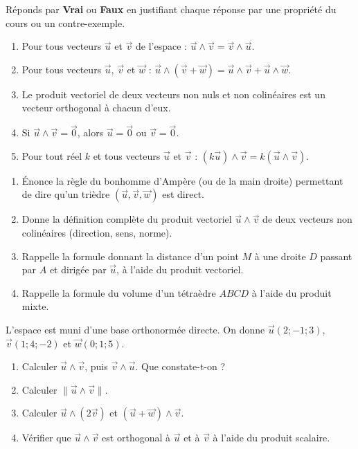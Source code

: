 \documentclass[11pt]{article}
\begin{document}
\begin{exercice}
Réponds par \textbf{Vrai} ou \textbf{Faux} en justifiant chaque réponse par une propriété du cours ou un contre-exemple.
\begin{enumerate}
\item Pour tous vecteurs $\vec{u}$ et $\vec{v}$ de l'espace : $\vec{u} \wedge \vec{v} = \vec{v} \wedge \vec{u}$.
\item Pour tous vecteurs $\vec{u}$, $\vec{v}$ et $\vec{w}$ : $\vec{u} \wedge (\vec{v} + \vec{w}) = \vec{u} \wedge \vec{v} + \vec{u} \wedge \vec{w}$.
\item Le produit vectoriel de deux vecteurs non nuls et non colinéaires est un vecteur orthogonal à chacun d'eux.
\item Si $\vec{u} \wedge \vec{v} = \vec{0}$, alors $\vec{u} = \vec{0}$ ou $\vec{v} = \vec{0}$.
\item Pour tout réel $k$ et tous vecteurs $\vec{u}$ et $\vec{v}$ : $(k\vec{u}) \wedge \vec{v} = k(\vec{u} \wedge \vec{v})$.
\end{enumerate}
\end{exercice}

\begin{exercice}
\begin{enumerate}
\item Énonce la règle du bonhomme d'Ampère (ou de la main droite) permettant de dire qu'un trièdre $(\vec{u}, \vec{v}, \vec{w})$ est direct.
\item Donne la définition complète du produit vectoriel $\vec{u} \wedge \vec{v}$ de deux vecteurs non colinéaires (direction, sens, norme).
\item Rappelle la formule donnant la distance d'un point $M$ à une droite $D$ passant par $A$ et dirigée par $\vec{u}$, à l'aide du produit vectoriel.
\item Rappelle la formule du volume d'un tétraèdre $ABCD$ à l'aide du produit mixte.
\end{enumerate}
\end{exercice}

\begin{exercice}
L'espace est muni d'une base orthonormée directe. On donne $\vec{u}(2 ; -1 ; 3)$, $\vec{v}(1 ; 4 ; -2)$ et $\vec{w}(0 ; 1 ; 5)$.
\begin{enumerate}
\item Calculer $\vec{u} \wedge \vec{v}$, puis $\vec{v} \wedge \vec{u}$. Que constate-t-on ?
\item Calculer $\|\vec{u} \wedge \vec{v}\|$.
\item Calculer $\vec{u} \wedge (2\vec{v})$ et $(\vec{u} + \vec{w}) \wedge \vec{v}$.
\item Vérifier que $\vec{u} \wedge \vec{v}$ est orthogonal à $\vec{u}$ et à $\vec{v}$ à l'aide du produit scalaire.
\end{enumerate}
\end{exercice}
\end{document}
